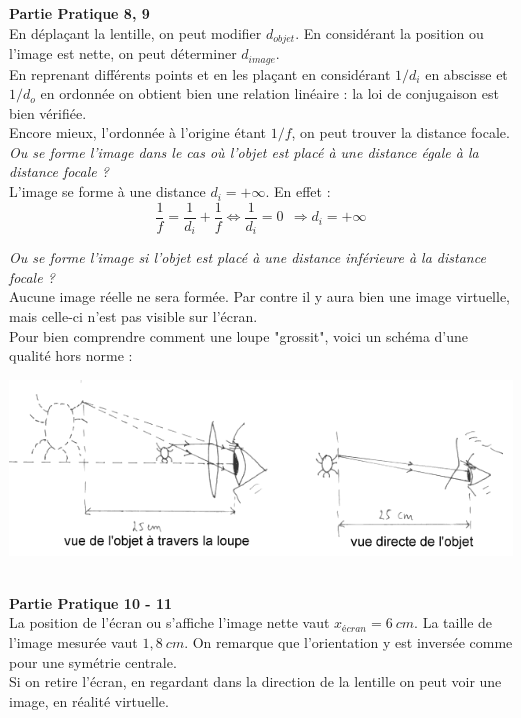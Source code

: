 \documentclass	[11pt, a4paper, openany]{book}
\begin{document}
\textbf{Partie Pratique 8, 9}\\
En déplaçant la lentille, on peut modifier $d_{objet}$. En considérant la position ou l'image est nette, on peut déterminer $d_{image}$.\\
En reprenant différents points et en les plaçant en considérant $1/d_i$ en abscisse et $1/d_o$ en ordonnée on obtient bien une relation linéaire : la loi de conjugaison est bien vérifiée.\\
Encore mieux, l'ordonnée à l'origine étant $1/f$, on peut trouver la distance focale.\\

\textit{Ou se forme l'image dans le cas où l'objet est placé à une distance égale à la distance focale ? }\\
L'image se forme à une distance $d_i = + \infty$. En effet : 
\begin{equation}
\frac{1}{f} = \frac{1}{d_i} + \frac{1}{f} \Leftrightarrow \frac{1}{d_i} = 0\ \ \Rightarrow d_i = +\infty
\end{equation}

\textit{Ou se forme l'image si l'objet est placé à une distance inférieure à la distance focale ?}\\
Aucune image réelle ne sera formée. Par contre il y aura bien une image virtuelle, mais celle-ci n'est pas visible sur l'écran.\\
Pour bien comprendre comment une loupe "grossit", voici un schéma d'une qualité hors norme : 
\begin{center}
\includegraphics[scale=0.6]{labo/image32.png}
\end{center}\ \\

\textbf{Partie Pratique 10 - 11}\\
La position de l'écran ou s'affiche l'image nette vaut $x_{écran} = 6\ cm$. La taille de l'image mesurée vaut $1,8\ cm$. On remarque que l'orientation y est inversée comme pour une symétrie centrale.\\

Si on retire l'écran, en regardant dans la direction de la lentille on peut voir une image, en réalité virtuelle.\\
\end{document}
